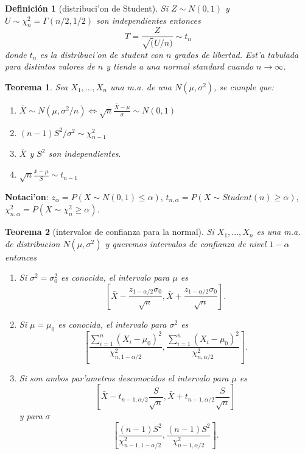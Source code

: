 \documentclass[a4paper,spanish]{article}
\newtheorem{teo}{Teorema}
\newtheorem{defi}{Definici\'on}
\begin{document}
\begin{defi}[distribuci'on de Student]
Si $Z \sim N(0,1)$ y $U \sim \chi^2_n = \Gamma(n/2,1/2)$ son independientes
entonces
$$T = \frac{Z}{\sqrt(U/n)} \sim t_n$$
donde $t_n$ es la \emph{distribuci'on de student} con $n$ grados de libertad.
Est'a tabulada para distintos valores de $n$ y tiende a una normal standard
cuando $n \rightarrow \infty$.
\end{defi}

\begin{teo}
Sea $X_1,...,X_n$ una m.a. de una $N(\mu,\sigma^2)$, se cumple que:
\begin{enumerate}
\item $\bar{X} \sim N(\mu,\sigma^2/n) \Leftrightarrow 
	\sqrt{n}\frac{\bar{X}-\mu}{\sigma} \sim N(0,1)$
\item $(n-1)S^2 / \sigma^2 \sim \chi^2_{n-1}$
\item $\bar{X}$ y $S^2$ son independientes.
\item $\sqrt{n}\frac{\bar{x}-\mu}{S} \sim t_{n-1}$
\end{enumerate}
\end{teo}

\textbf{Notaci'on}: $z_\alpha = P(X \sim N(0,1) \leq \alpha)$, 
$t_{n,\alpha} = P(X \sim Student(n) \geq \alpha)$, 
$\chi^2_{n,\alpha} = P(X \sim \chi^2_n \geq \alpha)$.

\begin{teo}[intervalos de confianza para la normal]
Si $X_1,...,X_n$ es una m.a. de distribucion $N(\mu,\sigma^2)$ y queremos
intervalos de confianza de nivel $1-\alpha$ entonces
\begin{enumerate}
\item Si $\sigma^2 = \sigma^2_0$ es conocida, el intervalo para $\mu$ es
$$\left[\bar{X}-\frac{z_{1-\alpha/2}\sigma_0}{\sqrt{n}},
	\bar{X}+\frac{z_{1-\alpha/2}\sigma_0}{\sqrt{n}}\right].$$
\item Si $\mu = \mu_0$ es conocida, el intervalo para $\sigma^2$ es
$$\left[\frac{\displaystyle \sum_{i=1}^n (X_i - \mu_0)^2}
			 {\chi^2_{n,1-\alpha/2}},
	\frac{\displaystyle \sum_{i=1}^n (X_i - \mu_0)^2}
		 {\chi^2_{n,\alpha/2}}\right].$$
\item Si son ambos par'ametros desconocidos el intervalo para $\mu$ es
$$\left[\bar{X}-t_{n-1,\alpha/2} \frac{S}{\sqrt{n}},
	\bar{X}+t_{n-1,\alpha/2} \frac{S}{\sqrt{n}}\right]$$
y para $\sigma$
$$\left[\frac{(n-1)S^2}{\chi^2_{n-1,1-\alpha/2}},
	\frac{(n-1)S^2}{\chi^2_{n-1,\alpha/2}}\right].$$
\end{enumerate}
\end{teo}
\end{document}
